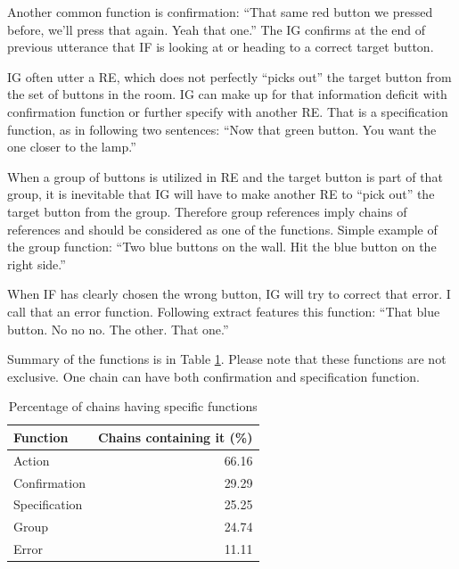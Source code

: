 Another common function is confirmation: ``That same red button we pressed before, we'll press that again. Yeah that one.'' The IG confirms at the end of previous utterance that IF is looking at or heading to a correct target button.

IG often utter a RE, which does not perfectly ``picks out'' the target button from the set of buttons in the room. IG can make up for that information deficit with confirmation function or further specify with another RE. That is a specification function, as in following two sentences: ``Now that green button. You want the one closer to the lamp.''

When a group of buttons is utilized in RE and the target button is part of that group, it is inevitable that IG will have to make another RE to ``pick out'' the target button from the group. Therefore group references imply chains of references and should be considered as one of the functions. Simple example of the group function: ``Two blue buttons on the wall. Hit the blue button on the right side.''

When IF has clearly chosen the wrong button, IG will try to correct that error. I call that an error function. Following extract features this function: ``That blue button. No no no. The other. That one.''

Summary of the functions is in Table \ref{tab:chains-functions}. Please note that these functions are not exclusive. One chain can have both confirmation and specification function.

\begin{table}[!htbp]
 \centering
\begin{tabular}{lr}
\toprule
Function   & Chains containing it (\%)  \\
\midrule
Action    		& 66.16\\
Confirmation	 	& 29.29\\
Specification 	& 25.25\\
Group 	  		& 24.74\\
Error 			& 11.11\\
\bottomrule
\end{tabular}
\caption{Percentage of chains having specific functions}
\label{tab:chains-functions}
\end{table}



